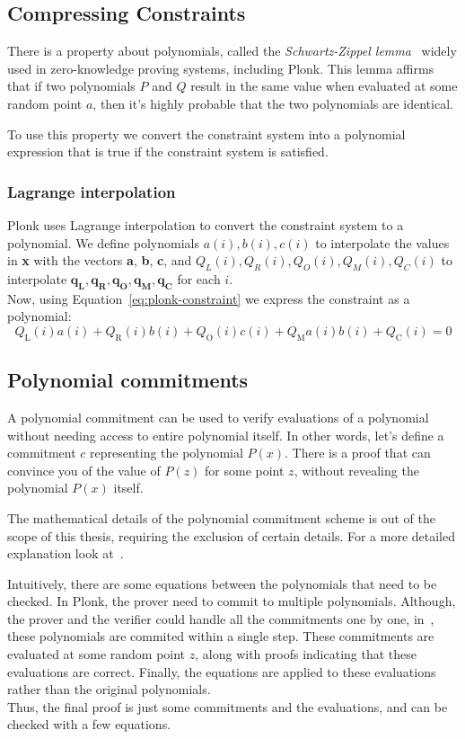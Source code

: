 \subsection{Compressing Constraints}
There is a property about polynomials, called the \textit{Schwartz-Zippel lemma}~\cite{zippel1979probabilistic, barbara2021reinforced} widely used in zero-knowledge proving systems, including Plonk. This lemma affirms that if two polynomials $P$ and $Q$ result in the same value when evaluated at some random point $a$, then it's highly probable that the two polynomials are identical.

To use this property we convert the constraint system into a polynomial expression that is true if the constraint system is satisfied.

\subsubsection*{Lagrange interpolation}
Plonk uses Lagrange interpolation to convert the constraint system to a polynomial. We define polynomials $a(i),b(i),c(i)$ to interpolate the values in \textbf{x} with the vectors \textbf{a}, \textbf{b}, \textbf{c}, and $Q_L(i),Q_R(i),Q_O(i),Q_M(i),Q_C(i)$ to interpolate $\textbf{q}_\textbf{L},\textbf{q}_\textbf{R},\textbf{q}_\textbf{O}, \textbf{q}_\textbf{M}, \textbf{q}_\textbf{C}$ for each $i$.\\
Now, using Equation~\eqref{eq:plonk-constraint} we express the constraint as a polynomial:
\begin{equation}
    Q_\text{L}(i)a(i)+Q_\text{R}(i)b(i)+Q_\text{O}(i)c(i)+Q_\text{M}a(i)b(i)+Q_\text{C}(i)=0
\end{equation}

\subsection{Polynomial commitments}
A polynomial commitment can be used to verify evaluations of a polynomial without needing access to entire polynomial itself. In other words, let's define a commitment $c$ representing the polynomial $P(x)$. There is a proof that can convince you of the value of $P(z)$ for some point $z$, without revealing the polynomial $P(x)$ itself.

The mathematical details of the polynomial commitment scheme is out of the scope of this thesis, requiring the exclusion of certain details. For a more detailed explanation look at~\cite{10.1007/978-3-642-17373-8_11}.

Intuitively, there are some equations between the polynomials that need to be checked. In Plonk, the prover need to commit to multiple polynomials. Although, the prover and the verifier could handle all the commitments one by one, in~\cite{gabizon2019plonk}, these polynomials are commited within a single step.
These commitments are evaluated at some random point $z$, along with proofs indicating that these evaluations are correct. Finally, the equations are applied to these evaluations rather than the original polynomials.\\
Thus, the final proof is just some commitments and the evaluations, and can be checked with a few equations.